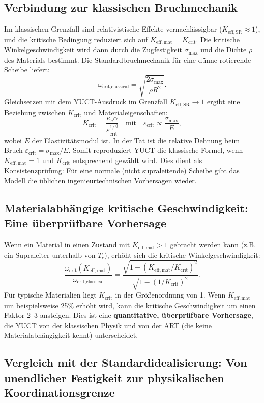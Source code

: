 \documentclass[12pt,a4paper]{article}
\newcommand{\kappac}{\kappa_c}
\newcommand{\betaf}{\beta}
\newcommand{\Keffmat}{K_{\mathrm{eff,mat}}}
\newcommand{\KeffSR}{K_{\mathrm{eff,SR}}}
\newcommand{\Kcrit}{K_{\mathrm{crit}}}
\begin{document}
	\subsection{Verbindung zur klassischen Bruchmechanik}
	
	Im klassischen Grenzfall sind relativistische Effekte vernachlässigbar (\(\KeffSR \approx 1\)), und die kritische Bedingung reduziert sich auf \(\Keffmat = \Kcrit\). Die kritische Winkelgeschwindigkeit wird dann durch die Zugfestigkeit \(\sigma_{\text{max}}\) und die Dichte \(\rho\) des Materials bestimmt. Die Standardbruchmechanik für eine dünne rotierende Scheibe liefert:
	\[
	\omega_{\text{crit,classical}} = \sqrt{\frac{2\sigma_{\text{max}}}{\rho R^2}}.
	\]
	Gleichsetzen mit dem YUCT-Ausdruck im Grenzfall \(\KeffSR \to 1\) ergibt eine Beziehung zwischen \(\Kcrit\) und Materialeigenschaften:
	\[
	\Kcrit = \frac{\kappac \alpha}{\varepsilon_{\text{crit}}^{1/\betaf}} \quad \text{mit} \quad \varepsilon_{\text{crit}} \propto \frac{\sigma_{\text{max}}}{E},
	\]
	wobei \(E\) der Elastizitätsmodul ist. In der Tat ist die relative Dehnung beim Bruch \(\varepsilon_{\text{crit}} = \sigma_{\text{max}}/E\). Somit reproduziert YUCT die klassische Formel, wenn \(\Keffmat = 1\) und \(\Kcrit\) entsprechend gewählt wird. Dies dient als Konsistenzprüfung: Für eine normale (nicht supraleitende) Scheibe gibt das Modell die üblichen ingenieurtechnischen Vorhersagen wieder.
	
	\subsection{Materialabhängige kritische Geschwindigkeit: Eine überprüfbare Vorhersage}
	
	Wenn ein Material in einen Zustand mit \(\Keffmat > 1\) gebracht werden kann (z.B. ein Supraleiter unterhalb von \(T_c\)), erhöht sich die kritische Winkelgeschwindigkeit:
	\[
	\frac{\omega_{\text{crit}}(K_{\mathrm{eff,mat}})}{\omega_{\text{crit,classical}}} = \frac{ \sqrt{1 - (\Keffmat/\Kcrit)^2} }{ \sqrt{1 - (1/\Kcrit)^2} }.
	\]
	Für typische Materialien liegt \(\Kcrit\) in der Größenordnung von 1. Wenn \(\Keffmat\) um beispielsweise 25\% erhöht wird, kann die kritische Geschwindigkeit um einen Faktor 2–3 ansteigen. Dies ist eine \textbf{quantitative, überprüfbare Vorhersage}, die YUCT von der klassischen Physik und von der ART (die keine Materialabhängigkeit kennt) unterscheidet.
	
	\subsection{Vergleich mit der Standardidealisierung: Von unendlicher Festigkeit zur physikalischen Koordinationsgrenze}
	
\end{document}
